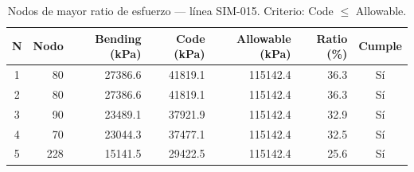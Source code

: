 \begin{table}[htbp]
  \centering
  \small
  \caption{Nodos de mayor ratio de esfuerzo — línea SIM-015. Criterio: Code $\leq$ Allowable.}
  \label{tab:top5-ratio}
  \begin{tabular}{crrrrrc}
    \toprule
    N & Nodo & Bending (\si{kPa}) & Code (\si{kPa}) & Allowable (\si{kPa}) & Ratio (\%) & Cumple \\
    \midrule
    1 & 80 & \num{27386.6} & \num{41819.1} & \num{115142.4} & 36.3 & Sí \\
    2 & 80 & \num{27386.6} & \num{41819.1} & \num{115142.4} & 36.3 & Sí \\
    3 & 90 & \num{23489.1} & \num{37921.9} & \num{115142.4} & 32.9 & Sí \\
    4 & 70 & \num{23044.3} & \num{37477.1} & \num{115142.4} & 32.5 & Sí \\
    5 & 228 & \num{15141.5} & \num{29422.5} & \num{115142.4} & 25.6 & Sí \\
    \bottomrule
  \end{tabular}
\end{table}
